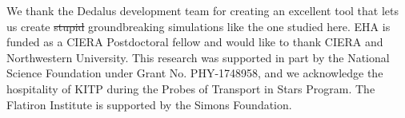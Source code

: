 \documentclass[onecolumn, twocolappendix]{aastex631}
\begin{document}








\begin{acknowledgments}
    We thank the Dedalus development team for creating an excellent tool that lets us create \sout{stupid} groundbreaking simulations like the one studied here.
    EHA is funded as a CIERA Postdoctoral fellow and would like to thank CIERA and Northwestern University. 
    This research was supported in part by the National Science Foundation under Grant No. PHY-1748958, and we acknowledge the hospitality of KITP during the Probes of Transport in Stars Program.
    The Flatiron Institute is supported by the Simons Foundation.
\end{acknowledgments}

\appendix







\newpage


\end{document}
